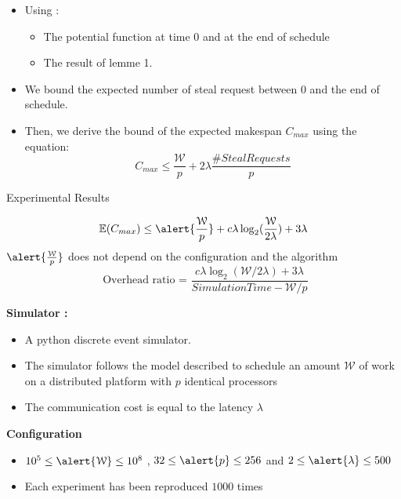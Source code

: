 \documentclass{beamer}
\begin{document}
    \begin{frame}
        \begin{itemize}
            \item Using :
        \begin{itemize}
            \item The potential function at time 0 and at the end of schedule
            \item The result of lemme 1.
        \end{itemize}
    \item We bound the expected number of steal request between $0$ and the end of schedule.
                
    \item Then, we derive the bound of the expected makespan $C_{max}$ using the equation:
        \begin{equation*}
            C_{max}  \leq \frac{\mathcal{W}}{p} + 2\lambda\frac{\#StealRequests}{p}
        \end{equation*} 
        \end{itemize}
\end{frame}

\begin{frame}{Experimental Results}

        \begin{equation*}   
            \mathbb{E}(C_{max}) \leq \alert{\frac{\mathcal{W}}{p}} +  c\lambda\log_2(\frac{\mathcal{W}}{2\lambda}) + 3\lambda
        \end{equation*}             
       $ \alert{\frac{\mathcal{W}}{p}} $ \alert{does not depend on the configuration and the algorithm }
\pause
    \begin{equation*}
        \text{ Overhead ratio = } \frac{c\lambda\log_2(\mathcal{W}/2\lambda) + 3\lambda}{Simulation Time - \mathcal{W}/p} 
    \end{equation*}
\pause

    \textbf{Simulator : }
    \begin{itemize}
        \item A python discrete event simulator.
        \item The simulator follows the model described to schedule an amount $\mathcal{W}$ of work on a distributed platform with $p$ identical processors 
        \item The communication cost is equal to the latency $\lambda$
    \end{itemize}
    \textbf{Configuration}
    \begin{itemize}
        \item  $ 10^5 \leq \alert{\mathcal{W}} \leq 10^8$
            , $ 32 \leq \alert{p} \leq 256$ and  
            $ 2 \leq \alert{\lambda} \leq 500$ 
        \item Each experiment has been reproduced \alert{$1000$} times
    \end{itemize}
\end{frame}
\end{document}
